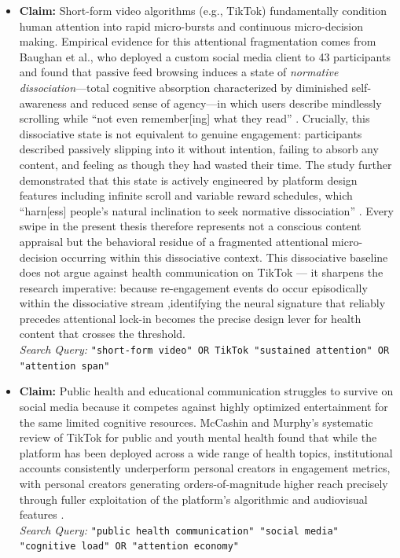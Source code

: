 \documentclass[12pt,a4paper]{report}
\begin{document}
\begin{itemize}
    \item \textbf{Claim:} Short-form video algorithms (e.g., TikTok) fundamentally condition human attention into rapid micro-bursts and continuous micro-decision making. Empirical evidence for this attentional fragmentation comes from Baughan et al., who deployed a custom social media client to 43 participants and found that passive feed browsing induces a state of \textit{normative dissociation}---total cognitive absorption characterized by diminished self-awareness and reduced sense of agency---in which users describe mindlessly scrolling while ``not even remember[ing] what they read'' \cite{baughan_i_2022}. Crucially, this dissociative state is not equivalent to genuine engagement: participants described passively slipping into it without intention, failing to absorb any content, and feeling as though they had wasted their time. The study further demonstrated that this state is actively engineered by platform design features including infinite scroll and variable reward schedules, which ``harn[ess] people's natural inclination to seek normative dissociation'' \cite{baughan_i_2022}. Every swipe in the present thesis therefore represents not a conscious content appraisal but the behavioral residue of a fragmented attentional micro-decision occurring within this dissociative context. This dissociative baseline does not argue against health communication on TikTok --- it sharpens the research imperative: because re-engagement events do occur episodically within the dissociative stream \cite{baughan_i_2022},identifying the neural signature that reliably precedes attentional lock-in becomes the precise design lever for health content that crosses the threshold.\\
    \textit{Search Query:} \texttt{"short-form video" OR TikTok "sustained attention" OR "attention span"}
    
    \item \textbf{Claim:} Public health and educational communication struggles to survive on social media because it competes against highly optimized entertainment for the same limited cognitive resources. McCashin and Murphy's systematic review of TikTok for public and youth mental health found that while the platform has been deployed across a wide range of health topics, institutional accounts consistently underperform personal creators in engagement metrics, with personal creators generating orders-of-magnitude higher reach precisely through fuller exploitation of the platform's algorithmic and audiovisual features \cite{mccashin_using_2023}.\\
    \textit{Search Query:} \texttt{"public health communication" "social media" "cognitive load" OR "attention economy"}
    

\end{itemize}
\end{document}
